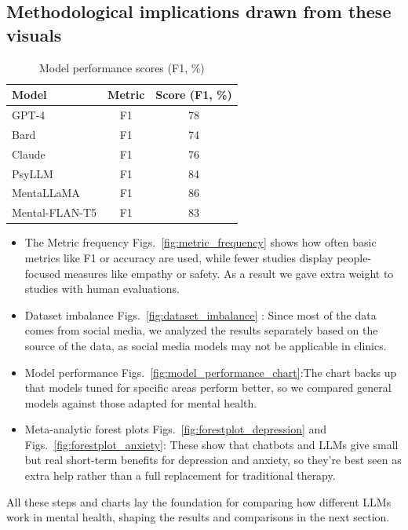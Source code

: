 \documentclass[sn-basic,authoryear]{sn-jnl}
\begin{document}
\subsection{Methodological implications drawn from these visuals}

\begin{table}[htbp]
\centering
\caption{Model performance scores (F1, \%)}
\begin{tabular}{lcc}
\hline
\textbf{Model} & \textbf{Metric} & \textbf{Score (F1, \%)} \\
\hline
GPT-4 & F1 & 78 \\
Bard & F1 & 74 \\
Claude & F1 & 76 \\
PsyLLM & F1 & 84 \\
MentaLLaMA & F1 & 86 \\
Mental-FLAN-T5 & F1 & 83 \\
\hline
\end{tabular}
\label{tab:model_performance}
\end{table}

\begin{itemize}
    \item The Metric frequency Figs.~\ref{fig:metric_frequency} shows how often  basic metrics like F1 or accuracy are used, while fewer studies display people-focused measures like empathy or safety. As a result we gave extra weight to studies with human evaluations.
    \item Dataset imbalance Figs.~\ref{fig:dataset_imbalance} : Since most of the data comes from social media, we analyzed the results separately based on the source of the data, as social media models may not be applicable in clinics.
    \item Model performance Figs.~\ref{fig:model_performance_chart}:The chart backs up that models tuned for specific areas perform better, so we compared general models against those adapted for mental health.
    \item Meta-analytic forest plots Figs.~\ref{fig:forestplot_depression} and Figs.~\ref{fig:forestplot_anxiety}: These show that chatbots and LLMs give small but real short-term benefits for depression and anxiety, so they’re best seen as extra help rather than a full replacement for traditional therapy.
\end{itemize}

All these steps and charts lay the foundation for comparing how different LLMs work in mental health, shaping the results and comparisons in the next section.
\end{document}
